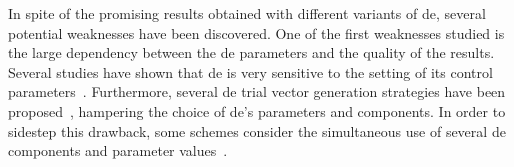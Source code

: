 \documentclass[preprint,3p]{elsarticle}
\newcommand{\DE}{{\sc de}}
\begin{document}
In spite of the promising results obtained with different variants of \DE{}, several potential weaknesses have
been discovered.
%
One of the first weaknesses studied %
is the large dependency between the \DE{} parameters and the quality of the results.
%
%
Several studies have shown that \DE{} is very sensitive to the setting of its control parameters~\cite{Gamperle:02,Zielinski:06}.
%
Furthermore, several \DE{} trial vector generation strategies have been proposed~\cite{Price:05,Gong:11}, hampering the choice of \DE{}'s parameters and components.
%
In order to sidestep this drawback, some schemes consider the simultaneous use of several \DE{} components and parameter values~\cite{Zhang:09,Piotrowski:13}.
%
%

%
%
%
%
%
%
%
%
%
\end{document}
